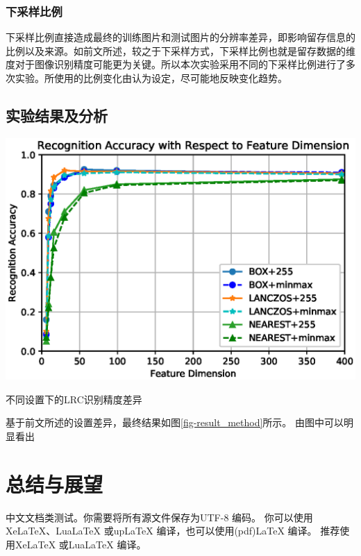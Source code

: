\documentclass[UTF8]{ctexart}
\begin{document}
\subsubsection{下采样比例}

下采样比例直接造成最终的训练图片和测试图片的分辨率差异，即影响留存信息的比例以及来源。如前文所述，较之于下采样方式，下采样比例也就是留存数据的维度对于图像识别精度可能更为关键。所以本次实验采用不同的下采样比例进行了多次实验。所使用的比例变化由认为设定，尽可能地反映变化趋势。
\subsection{实验结果及分析}
\begin{table}[h]
    \centering
    \includegraphics{RA_Method.eps}
    \caption{不同设置下的LRC识别精度差异}\label{tab-downsampling_factor}
\end{table}
基于前文所述的设置差异，最终结果如图\ref{fig-result_method}所示。
由图中可以明显看出

\section{总结与展望}\label{sec-4}

中文文档类测试。你需要将所有源文件保存为UTF-8 编码。
你可以使用XeLaTeX、LuaLaTeX 或upLaTeX 编译，也可以使用(pdf)LaTeX 编译。
推荐使用XeLaTeX 或LuaLaTeX 编译。
\appendix

\printindex %
\end{document}
